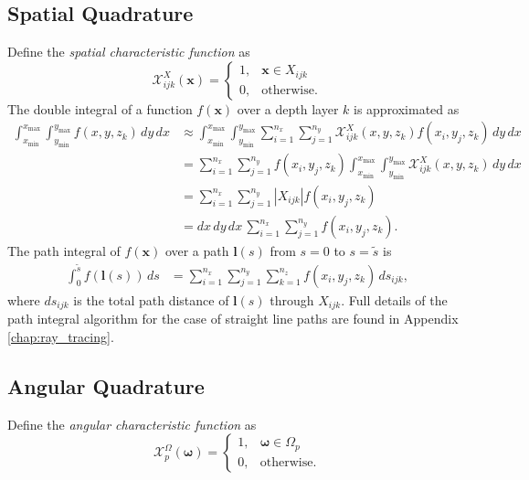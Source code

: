 \documentclass[ms,cpyr,lof,lot]{uathesis}
\newcommand\xmin{{x_{\min}}}
\newcommand\xmax{{x_{\max}}}
\newcommand\ymin{{y_{\min}}}
\newcommand\ymax{{y_{\max}}}
\newcommand\abs[1]{\left| #1 \right|}
\renewcommand\vec\bm
\begin{document}
\subsection{Spatial Quadrature}
Define the \textit{spatial characteristic function} as
\begin{equation*}
  \mathcal{X}^X_{ijk}(\vec{x}) = \begin{cases}
    1, & \vec{x} \in X_{ijk} \\
    0, & \mbox{otherwise}.
  \end{cases}
\end{equation*}
The double integral of a function $f(\vec{x})$ over a depth layer $k$ is approximated as
\begin{align*}
  \int_\xmin^\xmax\int_\ymin^\ymax f(x, y, z_k)\, dy\, dx &\approx \int_\xmin^\xmax \int_\ymin^\ymax \sum_{i=1}^{n_x}\sum_{j=1}^{n_y} \mathcal{X}^X_{ijk}(x,y,z_k) f(x_i, y_j, z_k)\, dy\, dx \\
  &= \sum_{i=1}^{n_x}\sum_{j=1}^{n_y} f(x_i, y_j, z_k) \int_\xmin^\xmax \int_\ymin^\ymax \mathcal{X}^X_{ijk}(x,y,z_k) \, dy\, dx \\
  &= \sum_{i=1}^{n_x}\sum_{j=1}^{n_y} \abs{X_{ijk}} f(x_i, y_j, z_k) \\
  &= dx\, dy\, dx\, \sum_{i=1}^{n_x}\sum_{j=1}^{n_y} f(x_i, y_j, z_k).
\end{align*}
The path integral of $f(\vec{x})$ over a path $\vec{l}(s)$ from $s=0$ to $s=\tilde{s}$ is
\begin{align*}
  \int_0^{\tilde{s}} f(\vec{l}(s))\, ds &= \sum_{i=1}^{n_x}\sum_{j=1}^{n_y}\sum_{k=1}^{n_z} f(x_i, y_j, z_k)\, ds_{ijk},
\end{align*}
where $ds_{ijk}$ is the total path distance of $\vec{l}(s)$ through $X_{ijk}$.
Full details of the path integral algorithm for the case of straight line paths are found in Appendix \ref{chap:ray_tracing}.

\subsection{Angular Quadrature}
Define the \textit{angular characteristic function} as
\begin{equation*}
  \mathcal{X}^\Omega_p(\vec{\omega}) = \begin{cases}
    1, & \vec{\omega} \in \Omega_p \\
    0, & \mbox{otherwise}.
  \end{cases}
\end{equation*}
\end{document}
